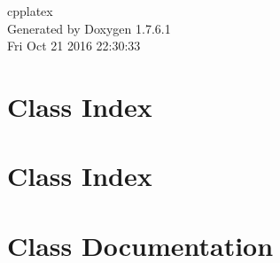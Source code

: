 \documentclass[a4paper]{book}
\begin{document}
\hypersetup{pageanchor=false,citecolor=blue}
\begin{titlepage}
\vspace*{7cm}
\begin{center}
{\Large cpplatex }\\
\vspace*{1cm}
{\large \-Generated by Doxygen 1.7.6.1}\\
\vspace*{0.5cm}
{\small Fri Oct 21 2016 22:30:33}\\
\end{center}
\end{titlepage}
\clearemptydoublepage
{}
\tableofcontents
\clearemptydoublepage
{}
\hypersetup{pageanchor=true,citecolor=blue}
\chapter{\-Class \-Index}

\chapter{\-Class \-Index}

\chapter{\-Class \-Documentation}




































\printindex
\end{document}
